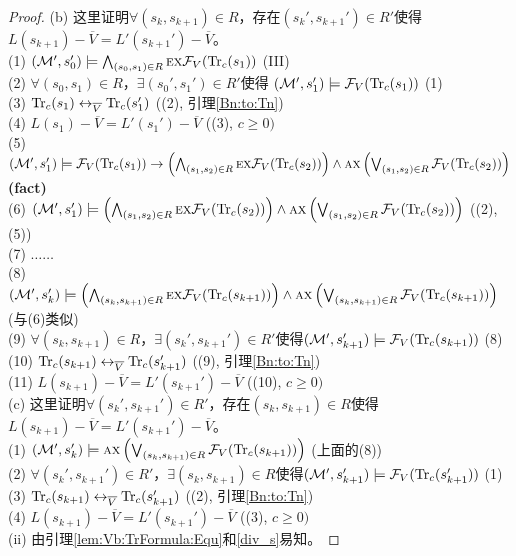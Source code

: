 \begin{proof}
	(b) 这里证明$\forall (s_k, s_{k+1}) \in R$，存在$(s_k', s_{k+1}') \in R'$使得$L(s_{k+1}) - \overline V = L'(s_{k+1}') - \overline V$。\\
	(1) $({\cal M}', s_0') \models \bigwedge_{(s_0, s_1) \in R} \textsc{e} \textsc{x} {\cal F}_V(\textrm{Tr}_c(s_1))$  \hfill  (III)\\
	(2) $\forall (s_0, s_1) \in R$，$\exists (s_0', s_1') \in R'$使得 $({\cal M}', s_1') \models {\cal F}_V(\textrm{Tr}_c(s_1))$  \hfill  (1)\\
	(3) $\textrm{Tr}_c(s_1) \leftrightarrow_{\overline V} \textrm{Tr}_c(s_1')$  \hfill  ((2), 引理\ref{Bn:to:Tn}) \\
	(4) $L(s_1) - \overline V = L'(s_1') - \overline V$  \hfill   ((3), $c \geq 0)$\\
	(5) $({\cal M}', s_1') \models {\cal F}_V(\textrm{Tr}_c(s_1)) \rightarrow \left(\bigwedge_{(s_1,s_2)\in R} \textsc{e} \textsc{x} {\cal F}_V(\textrm{Tr}_c(s_2))\right) \wedge \textsc{a} \textsc{x} \left(\bigvee_{(s_1,s_2)\in R} {\cal F}_V(\textrm{Tr}_c(s_2))\right)$     \hfill  \textbf{(fact)}\\
	(6) $({\cal M}', s_1') \models \left(\bigwedge_{(s_1,s_2)\in R} \textsc{e} \textsc{x} {\cal F}_V(\textrm{Tr}_c(s_2))\right) \wedge \textsc{a} \textsc{x} \left(\bigvee_{(s_1,s_2)\in R} {\cal F}_V(\textrm{Tr}_c(s_2))\right)$ \hfill ((2), (5))\\
	(7) $\dots \dots$ \\
	(8) $({\cal M}', s_k') \models \left(\bigwedge_{(s_k,s_{k+1})\in R} \textsc{e} \textsc{x} {\cal F}_V(\textrm{Tr}_c(s_{k+1}))\right) \wedge \textsc{a} \textsc{x} \left(\bigvee_{(s_k,s_{k+1})\in R} {\cal F}_V(\textrm{Tr}_c(s_{k+1}))\right)$       \hfill (与(6)类似)\\
	(9) $\forall (s_k, s_{k+1}) \in R$，$\exists (s_k', s_{k+1}') \in R'$使得$({\cal M}', s_{k+1}') \models {\cal F}_V(\textrm{Tr}_c(s_{k+1}))$  \hfill  (8)\\
	(10) $\textrm{Tr}_c(s_{k+1}) \leftrightarrow_{\overline V} \textrm{Tr}_c(s_{k+1}')$    \hfill ((9), 引理\ref{Bn:to:Tn}) \\
	(11) $L(s_{k+1}) - \overline V = L'(s_{k+1}') - \overline V$  \hfill   ((10), $c \geq 0)$\\
	
	(c) 这里证明$\forall (s_k', s_{k+1}') \in R'$，存在$(s_k, s_{k+1})\in R$使得$L(s_{k+1}) - \overline V = L'(s_{k+1}') - \overline V$。\\
	(1) $({\cal M}', s_k') \models \textsc{a} \textsc{x} \left(\bigvee_{(s_k,s_{k+1})\in R} {\cal F}_V(\textrm{Tr}_c(s_{k+1}))\right)$  \hfill (上面的(8))\\
	(2) $\forall (s_k', s_{k+1}') \in R'$，$\exists (s_k, s_{k+1}) \in R$使得$({\cal M}', s_{k+1}') \models {\cal F}_V(\textrm{Tr}_c(s_{k+1}'))$  \hfill (1) \\
	(3) $\textrm{Tr}_c(s_{k+1}) \leftrightarrow_{\overline V} \textrm{Tr}_c(s_{k+1}')$    \hfill ((2), 引理\ref{Bn:to:Tn}) \\
	(4) $L(s_{k+1}) - \overline V = L'(s_{k+1}') - \overline V$  \hfill   ((3), $c \geq 0)$\\
	
	(ii) 由引理\ref{lem:Vb:TrFormula:Equ}和\ref{div_s}易知。
	
\end{proof}

